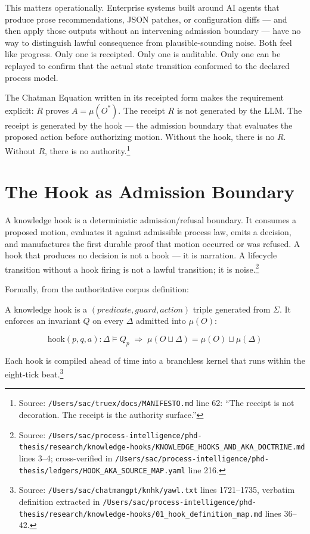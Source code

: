 This matters operationally. Enterprise systems built around AI agents that produce prose
recommendations, JSON patches, or configuration diffs --- and then apply those outputs without
an intervening admission boundary --- have no way to distinguish lawful consequence from
plausible-sounding noise. Both feel like progress. Only one is receipted. Only one is
auditable. Only one can be replayed to confirm that the actual state transition conformed to
the declared process model.

The Chatman Equation written in its receipted form makes the requirement explicit: $R$ proves
$A = \mu(O^{*})$. The receipt $R$ is not generated by the LLM. The receipt is generated by
the hook --- the admission boundary that evaluates the proposed action before authorizing
motion. Without the hook, there is no $R$. Without $R$, there is no authority.\footnote{Source:
\texttt{/Users/sac/truex/docs/MANIFESTO.md} line 62: ``The receipt is not decoration. The receipt
is the authority surface.''}

\section{The Hook as Admission Boundary}
\label{sec:hooks-admission-boundary}

A knowledge hook is a deterministic admission/refusal boundary. It consumes a proposed motion,
evaluates it against admissible process law, emits a decision, and manufactures the first
durable proof that motion occurred or was refused. A hook that produces no decision is not a
hook --- it is narration. A lifecycle transition without a hook firing is not a lawful
transition; it is noise.\footnote{Source:
\texttt{/Users/sac/process-intelligence/phd-thesis/research/knowledge-hooks/KNOWLEDGE\_HOOKS\_AND\_AKA\_DOCTRINE.md}
lines 3--4; cross-verified in
\texttt{/Users/sac/process-intelligence/phd-thesis/ledgers/HOOK\_AKA\_SOURCE\_MAP.yaml} line 216.}

Formally, from the authoritative corpus definition:

\begin{definition}
A knowledge hook is a $(\textit{predicate}, \textit{guard}, \textit{action})$ triple generated
from $\Sigma$. It enforces an invariant $Q$ on every $\Delta$ admitted into $\mu(O)$:

\[
  \text{hook}(p, q, a): \Delta \vDash Q_p \;\Rightarrow\; \mu(O \sqcup \Delta) = \mu(O) \sqcup \mu(\Delta)
\]

Each hook is compiled ahead of time into a branchless kernel that runs within the eight-tick
beat.\footnote{Source: \texttt{/Users/sac/chatmangpt/knhk/yawl.txt} lines 1721--1735, verbatim
definition extracted in
\texttt{/Users/sac/process-intelligence/phd-thesis/research/knowledge-hooks/01\_hook\_definition\_map.md}
lines 36--42.}
\end{definition}

